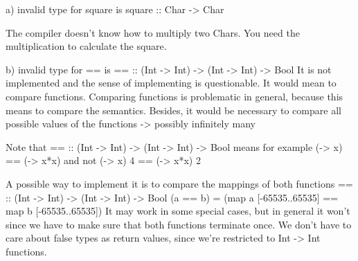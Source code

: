a) invalid type for square is
square :: Char -> Char

The compiler doesn't know how to multiply two Chars.
You need the multiplication to calculate the square.

b) invalid type for == is
== :: (Int -> Int) -> (Int -> Int) -> Bool
It is not implemented and the sense of implementing is questionable.
It would mean to compare functions. Comparing functions is problematic in general,
because this means to compare the semantics. Besides, it would be necessary to compare
all possible values of the functions -> possibly infinitely many

Note that
== :: (Int -> Int) -> (Int -> Int) -> Bool
means for example
(\x -> x) == (\x -> x*x)
and not
(\x -> x) 4 == (\x -> x*x) 2

A possible way to implement it is to compare the mappings of both functions
== :: (Int -> Int) -> (Int -> Int) -> Bool
(a == b) = (map a [-65535..65535] == map b [-65535..65535])
It may work in some special cases, but in general it won't since
we have to make sure that both functions terminate once. We don't
have to care about false types as return values, since we're
restricted to  Int -> Int functions.
